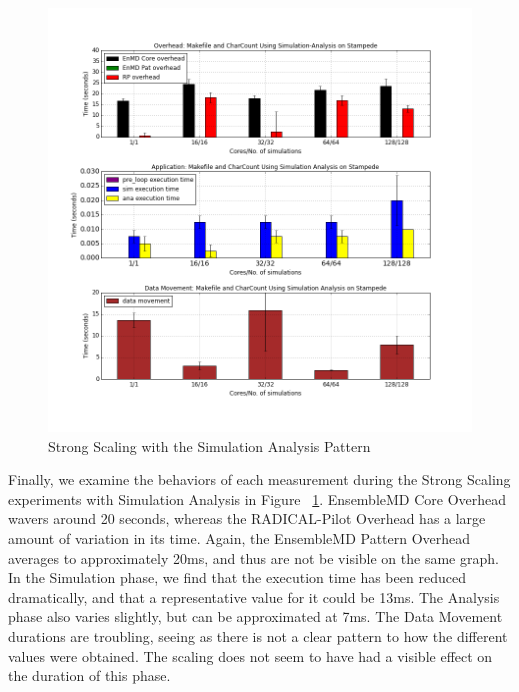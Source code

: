 \documentclass[]{article}
\begin{document}
		\begin{figure}[H]
			\centering
			\includegraphics[scale=.30]{iteration_3/sa_strong_scaling.png}
			\caption{Strong Scaling with the Simulation Analysis Pattern}
			\label{fig:sa_strong_scaling}
		\end{figure}
		
		Finally, we examine the behaviors of each measurement during the Strong Scaling experiments with Simulation Analysis in Figure ~\ref{fig:sa_strong_scaling}. EnsembleMD Core Overhead wavers around 20 seconds, whereas the RADICAL-Pilot Overhead has a large amount of variation in its time. Again, the EnsembleMD Pattern Overhead averages to approximately 20ms, and thus are not be visible on the same graph.
		In the Simulation phase, we find that the execution time has been reduced dramatically, and that a representative value for it could be 13ms. The Analysis phase also varies slightly, but can be approximated at 7ms.
		The Data Movement durations are troubling, seeing as there is not a clear pattern to how the different values were obtained. The scaling does not seem to have had a visible effect on the duration of this phase.
\end{document}
